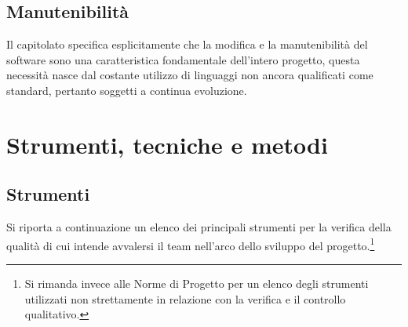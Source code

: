\subsection{Manutenibilità}
Il capitolato specifica esplicitamente che la modifica e la manutenibilità del software sono una caratteristica fondamentale dell'intero progetto, questa necessità nasce dal costante utilizzo di linguaggi non ancora qualificati come standard, pertanto soggetti a continua evoluzione.

\clearpage
\section{Strumenti, tecniche e metodi}

\subsection{Strumenti}\label{sec:tools}
Si riporta a continuazione un elenco dei principali strumenti per la verifica della qualità di cui intende avvalersi il team nell'arco dello sviluppo del progetto.\footnote{Si rimanda invece alle Norme di Progetto per un elenco degli strumenti utilizzati non strettamente in relazione con la verifica e il controllo qualitativo.}
